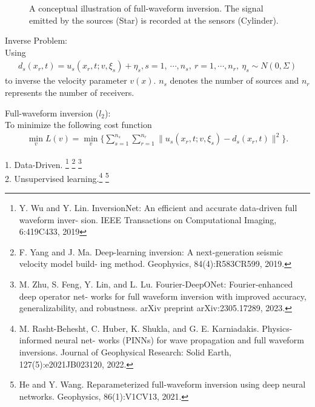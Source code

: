 \documentclass[mathserif,envcountsect,compress,8pt]{beamer}
\begin{document}
\begin{frame}
	\begin{figure}[H]
		\centering
		\centering
		\caption{A conceptual illustration of full-waveform inversion.  The signal emitted by the sources (Star) is recorded at the
			sensors (Cylinder).}\label{fig_wave_source}
	\end{figure}
\end{frame}

\begin{frame}
	Inverse Problem:\\
	Using
		{\color{blue}
			\begin{align*}
				d_s(x_r, t) = u_s(x_r, t; v, \xi_s) + \eta_s, s=1,~\cdots,n_s, ~r=1,\cdots,n_r,~\eta_s\sim N(0, \Sigma)
			\end{align*}}
	to inverse the velocity parameter {\color{blue}$v(x)$}. $n_s$ denotes the number of sources and $n_r$ represents the number of receivers.
	
	\vspace{10pt}
	Full-waveform inversion ($l_2$): \\
	To minimize the following cost function
	\begin{align*}
		\min\limits_{v} L(v)=\min\limits_{v}\{\sum_{s=1}^{n_s}\sum_{r=1}^{n_r}\|u_s(x_r,t;v,\xi_s)-d_s(x_r,t)\|^2\}.
	\end{align*}
\end{frame}


\begin{frame}

	{\color{blue}1. Data-Driven.} \footnote{\tiny Y. Wu and Y. Lin. InversionNet: An efficient and accurate data-driven full waveform inver-
		sion. IEEE Transactions on Computational Imaging, 6:419C433, 2019} \footnote{\tiny F. Yang and J. Ma. Deep-learning inversion: A next-generation seismic velocity model build-
		ing method. Geophysics, 84(4):R583CR599, 2019.} \footnote{\tiny M. Zhu, S. Feng, Y. Lin, and L. Lu. Fourier-DeepONet: Fourier-enhanced deep operator net-
		works for full waveform inversion with improved accuracy, generalizability, and robustness.
		arXiv preprint arXiv:2305.17289, 2023.}\\
	
	{\color{blue}2. Unsupervised learning.}\footnote{\tiny M. Rasht-Behesht, C. Huber, K. Shukla, and G. E. Karniadakis. Physics-informed neural net-
		works (PINNs) for wave propagation and full waveform inversions. Journal of Geophysical
		Research: Solid Earth, 127(5):e2021JB023120, 2022.} \footnote{\tiny He and Y. Wang. Reparameterized full-waveform inversion using deep neural networks.
		Geophysics, 86(1):V1CV13, 2021.}
	
\end{frame}
\end{document}
